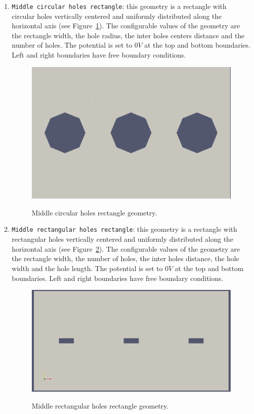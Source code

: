 \documentclass[11pt]{article}
\begin{document}
\begin{enumerate}
\item \texttt{Middle circular holes rectangle}: this geometry is a rectangle with circular
holes vertically centered and uniformly distributed along the horizontal axis (see
Figure~\ref{fig:mid_circle_geometry}). The configurable values of the geometry
are the rectangle width,
the hole radius, the inter holes centers distance and the number of holes.
The potential is set to $0V$ at the top and bottom boundaries. Left and right
boundaries have free boundary conditions.

\begin{figure}[H]
  \center
  \includegraphics[scale=0.2]{images/mid_circle_geometry.png}
  \label{fig:mid_circle_geometry}
  \caption{Middle circular holes rectangle geometry.}
\end{figure}


\item \texttt{Middle rectangular holes rectangle}: this geometry is a rectangle with rectangular
holes vertically centered and uniformly distributed along the horizontal axis
(see Figure~\ref{fig:mid_rect_geometry}).
The configurable values of the geometry are the rectangle width, the number of
holes, the inter holes distance, the hole width and the hole length.
The potential is set to $0V$ at the top and bottom boundaries. Left and right
boundaries have free boundary conditions.

\begin{figure}[H]
  \center
  \includegraphics[scale=0.2]{images/mid_rect_geometry.png}
  \label{fig:mid_rect_geometry}
  \caption{Middle rectangular holes rectangle geometry.}
\end{figure}



\end{enumerate}
\end{document}
